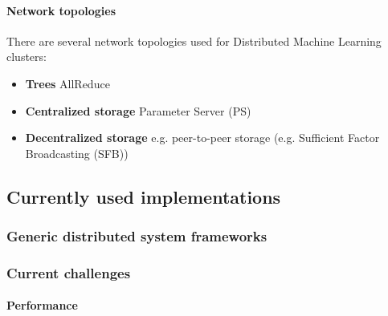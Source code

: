 \paragraph{Network topologies}
There are several network topologies used for Distributed Machine Learning clusters:
\begin{itemize}
	\item \textbf{Trees} AllReduce\cite{Agar14}
	\item \textbf{Centralized storage} Parameter Server (PS)\cite{Agar14}
	\item \textbf{Decentralized storage} e.g. peer-to-peer storage (e.g. Sufficient Factor Broadcasting (SFB)\cite{Li13})
\end{itemize}










\subsection{Currently used implementations}
\subsubsection{Generic distributed system frameworks}


\subsubsection{Current challenges}

\paragraph{Performance}

